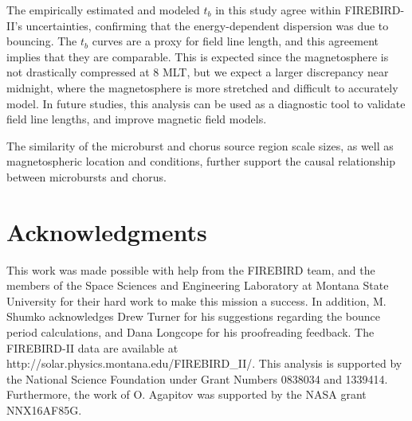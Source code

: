 The empirically estimated and modeled $t_b$ in this study agree within FIREBIRD-II's uncertainties, confirming that the energy-dependent dispersion was due to bouncing. The $t_b$ curves are a proxy for field line length, and this agreement implies that they are comparable. This is expected since the magnetosphere is not drastically compressed at 8 MLT, but we expect a larger discrepancy near midnight, where the magnetosphere is more stretched and difficult to accurately model. In future studies, this analysis can be used as a diagnostic tool to validate field line lengths, and improve magnetic field models.

The similarity of the microburst and chorus source region scale sizes, as well as magnetospheric location and conditions, further support the causal relationship between microbursts and chorus.

\section{Acknowledgments}
This work was made possible with help from the FIREBIRD team, and the members of the Space Sciences and Engineering Laboratory at Montana State University for their hard work to make this mission a success. In addition, M. Shumko acknowledges Drew Turner for his suggestions regarding the bounce period calculations, and Dana Longcope for his proofreading feedback. The FIREBIRD-II data are available at http://solar.physics.montana.edu/FIREBIRD\_II/. This analysis is supported by the National Science Foundation under Grant Numbers 0838034 and 1339414. Furthermore, the work of O. Agapitov was supported by the NASA grant NNX16AF85G.


%


%
